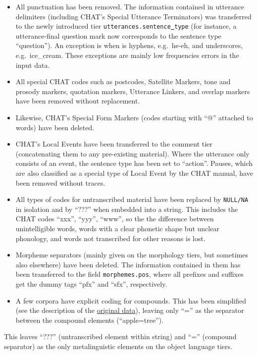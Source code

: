 \documentclass[a4paper, 11pt]{book}
\newcommand{\und}{\underline{{ }}\hspace{0.2mm}}	%
\begin{document}
\begin{itemize}
	\item All punctuation has been removed. The information contained in utterance delimiters (including CHAT’s Special Utterance Terminators) was transferred to the newly introduced tier \texttt{utterances.sentence\und type} (for instance, a utterance-final question mark now corresponds to the sentence type “question”). An exception is when is hyphens, e.g.\ he-eh, and underscores, e.g.\ ice\_cream. These exceptions are mainly low frequencies errors in the input data.
	\item All special CHAT codes such as postcodes, Satellite Markers, tone and prosody markers, quotation markers, Utterance Linkers, and overlap markers have been removed without replacement. 
	\item Likewise, CHAT’s Special Form Markers (codes starting with “@” attached to words) have been deleted. 
	\item CHAT’s Local Events have been transferred to the comment tier (concatenating them to any pre-existing material). Where the utterance only consists of an event, the sentence type has been set to “action”. Pauses, which are also classified as a special type of Local Event by the CHAT manual, have been removed without traces. 
	\item All types of codes for untranscribed material have been replaced by \texttt{NULL/NA} in isolation and by “???” when embedded into a string. This includes the CHAT codes “xxx”, “yyy”, “www”, so the the difference between unintelligible words, words with a clear phonetic shape but unclear phonology, and words not transcribed for other reasons is lost.
	\item Morpheme separators (mainly given on the morphology tiers, but sometimes also elsewhere) have been deleted. The information contained in them has been transferred to the field \texttt{morphemes.pos}, where all prefixes and suffixes get the dummy tags “pfx” and “sfx”, respectively. 
	\item A few corpora have explicit coding for compounds. This has been simplified (see the description of the \hyperref[cha:Data sources]{original data}), leaving only “=” as the separator between the compound elements (“apple=tree”). 
\end{itemize}

This leaves “???” (untranscribed element within string) and “=” (compound separator) as the only metalinguistic elements on the object language tiers. 
\end{document}

